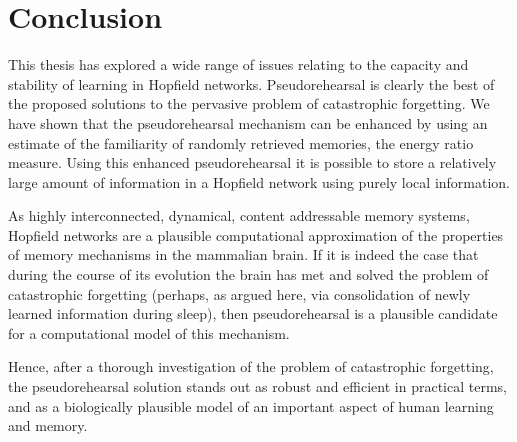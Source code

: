 \section{Conclusion}

This thesis has explored a wide range of issues relating to the capacity and stability of learning in Hopfield networks.  Pseudorehearsal is clearly the best of the proposed solutions to the pervasive problem of catastrophic forgetting.  We have shown that the pseudorehearsal mechanism can be enhanced by using an estimate of the familiarity of randomly retrieved memories, the energy ratio measure. Using this enhanced pseudorehearsal it is possible to store a relatively large amount of information in a Hopfield network using purely local information.

As highly interconnected, dynamical, content addressable memory systems, Hopfield networks are a plausible computational approximation of the properties of memory mechanisms in the mammalian brain.  If it is indeed the case that during the course of its evolution the brain has met and solved the problem of catastrophic forgetting (perhaps, as argued here, via consolidation of newly learned information during sleep), then pseudorehearsal is a plausible candidate for a computational model of this mechanism.

Hence, after a thorough investigation of the problem of catastrophic forgetting, the pseudorehearsal solution stands out as robust and efficient in practical terms, and as a biologically plausible model of an important aspect of human learning and memory.

